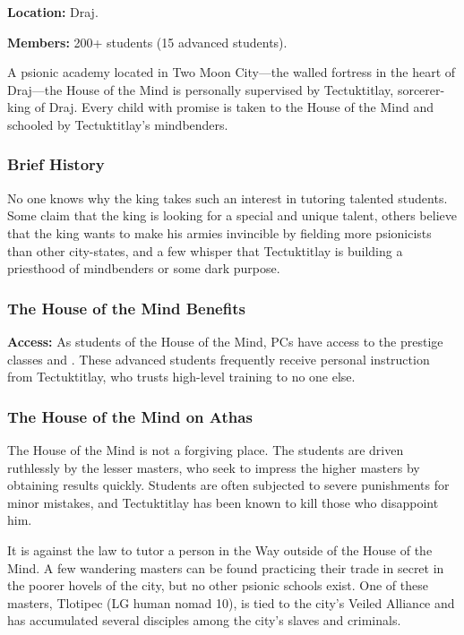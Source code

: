 \textbf{Location:} Draj.

\textbf{Members:} 200+ students (15 advanced students).

A psionic academy located in Two Moon City---the walled fortress in the heart of Draj---the House of the Mind is personally supervised by Tectuktitlay, sorcerer-king of Draj. Every child with promise is taken to the House of the Mind and schooled by Tectuktitlay's mindbenders.

\subsubsection{Brief History}
No one knows why the king takes such an interest in tutoring talented students. Some claim that the king is looking for a special and unique talent, others believe that the king wants to make his armies invincible by fielding more psionicists than other city-states, and a few whisper that Tectuktitlay is building a priesthood of mindbenders or some dark purpose.

\subsubsection{The House of the Mind Benefits}
\textbf{Access:} As students of the House of the Mind, PCs have access to the prestige classes  and . These advanced students frequently receive personal instruction from Tectuktitlay, who trusts high-level training to no one else.

\subsubsection{The House of the Mind on Athas}
The House of the Mind is not a forgiving place. The students are driven ruthlessly by the lesser masters, who seek to impress the higher masters by obtaining results quickly. Students are often subjected to severe punishments for minor mistakes, and Tectuktitlay has been known to kill those who disappoint him.

It is against the law to tutor a person in the Way outside of the House of the Mind. A few wandering masters can be found practicing their trade in secret in the poorer hovels of the city, but no other psionic schools exist. One of these masters, Tlotipec (LG human nomad 10), is tied to the city's Veiled Alliance and has accumulated several disciples among the city's slaves and criminals.

